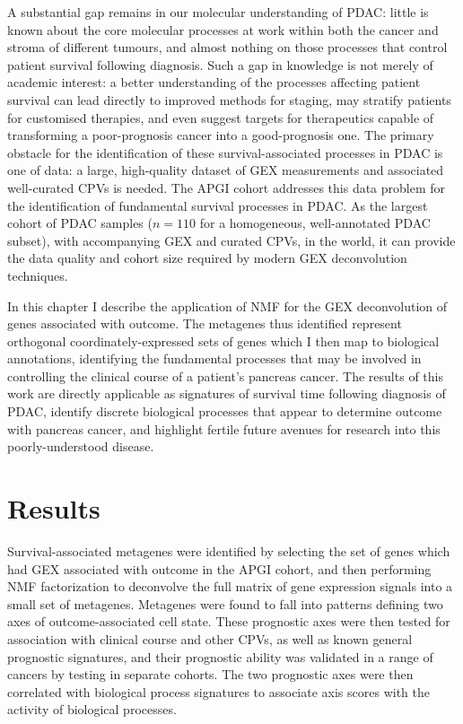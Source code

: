\documentclass[dissertation.tex]{subfiles}
\begin{document}
A substantial gap remains in our molecular understanding of \gls{PDAC}: little is known about the core molecular processes at work within both the cancer and stroma of different tumours, and almost nothing on those processes that control patient survival following diagnosis.  Such a gap in knowledge is not merely of academic interest: a better understanding of the processes affecting patient survival can lead directly to improved methods for staging, may stratify patients for customised therapies, and even suggest targets for therapeutics capable of transforming a poor-prognosis cancer into a good-prognosis one.  The primary obstacle for the identification of these survival-associated processes in \gls{PDAC} is one of data: a large, high-quality dataset of \gls{GEX} measurements and associated well-curated \glspl{CPV} is needed.  The \gls{APGI} cohort addresses this data problem for the identification of fundamental survival processes in \gls{PDAC}.  As the largest cohort of \gls{PDAC} samples ($n = 110$ for a homogeneous, well-annotated \gls{PDAC} subset), with accompanying \gls{GEX} and curated \glspl{CPV}, in the world, it can provide the data quality and cohort size required by modern \gls{GEX} deconvolution techniques.

In this chapter I describe the application of \gls{NMF} for the \gls{GEX} deconvolution of genes associated with outcome.  The metagenes thus identified represent orthogonal coordinately-expressed sets of genes which I then map to biological annotations, identifying the fundamental processes that may be involved in controlling the clinical course of a patient's pancreas cancer.  The results of this work are directly applicable as signatures of survival time following diagnosis of \gls{PDAC}, identify discrete biological processes that appear to determine outcome with pancreas cancer, and highlight fertile future avenues for research into this poorly-understood disease.


\section{Results}

Survival-associated metagenes were identified by selecting the set of genes which had \gls{GEX} associated with outcome in the \gls{APGI} cohort, and then performing \gls{NMF} factorization to deconvolve the full matrix of gene expression signals into a small set of metagenes.  Metagenes were found to fall into patterns defining two axes of outcome-associated cell state.  These prognostic axes were then tested for association with clinical course and other \glspl{CPV}, as well as known general prognostic signatures, and their prognostic ability was validated in a range of cancers by testing in separate cohorts.  The two prognostic axes were then correlated with biological process signatures to associate axis scores with the activity of biological processes.
\end{document}
